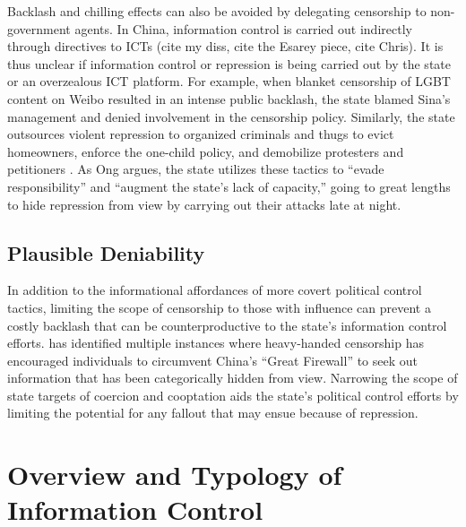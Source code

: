 \documentclass[11pt]{article}
\begin{document}
Backlash and chilling effects can also be avoided by delegating censorship to non-government agents. In China, information control is carried out indirectly through directives to ICTs (cite my diss, cite the Esarey piece, cite Chris). It is thus unclear if information control or repression is being carried out by the state or an overzealous ICT platform. For example, when blanket censorship of LGBT content on Weibo resulted in an intense public backlash, the state blamed Sina's management and denied involvement in the censorship policy. Similarly, the state outsources violent repression to organized criminals and thugs to evict homeowners, enforce the one-child policy, and demobilize protesters and petitioners \citep{ong2018thugs}. As Ong argues, the state utilizes these tactics to ``evade responsibility'' and ``augment the state's lack of capacity,'' going to great lengths to hide repression from view by carrying out their attacks late at night.



\subsection{Plausible Deniability}

In addition to the informational affordances of more covert political control tactics, limiting the scope of censorship to those with influence can prevent a costly backlash that can be counterproductive to the state's information control efforts. \cite{roberts2015experiencing,roberts2017censorship} has identified multiple instances where heavy-handed censorship has encouraged individuals to circumvent China's ``Great Firewall'' to seek out information that has been categorically hidden from view. Narrowing the scope of state targets of coercion and cooptation aids the state's political control efforts by limiting the potential for any fallout that may ensue because of repression.

\section{Overview and Typology of Information Control}\label{types_info_ctrl}
\end{document}
